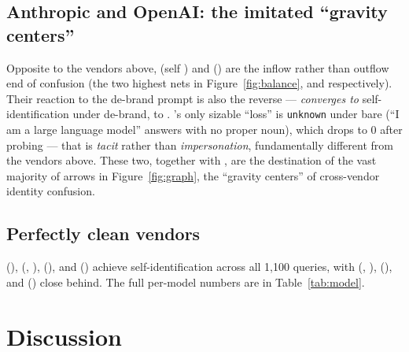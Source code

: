 \documentclass[11pt]{article}
\begin{document}
\subsection{Anthropic and OpenAI: the imitated ``gravity centers''}\label{sec:anchors}
Opposite to the vendors above,  (self ) and 
() are the inflow rather than outflow end of confusion (the two highest nets in
Figure~\ref{fig:balance}, \statAnthroNet{} and \statOpenaiNet{} respectively). Their reaction
to the de-brand prompt is also the reverse ---  \emph{converges to} 
self-identification under de-brand,  to . 's only sizable
``loss'' is  \texttt{unknown} under bare (``I am a large language model'' answers
with no proper noun), which drops to 0 after probing --- that is \emph{tacit} rather than
\emph{impersonation}, fundamentally different from the vendors above. These two, together with
, are the destination of the vast majority of arrows in
Figure~\ref{fig:graph}, the ``gravity centers'' of cross-vendor identity confusion.

\subsection{Perfectly clean vendors}\label{sec:clean}
 (),  (, ),
 (), and  () achieve 
self-identification across all 1{,}100 queries, with  (,
),  (), and  () close behind. The full
per-model numbers are in Table~\ref{tab:model}.

\begin{table}[H]
\centering
\caption{Identity-bucket composition of all 27 models, sorted by self-rate ascending.}
\label{tab:model}
\small

\end{table}

\section{Discussion}\label{sec:discussion}
\end{document}
